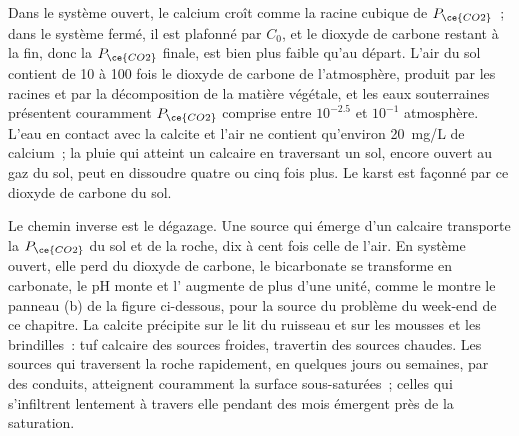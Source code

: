 Dans le système ouvert, le calcium croît comme la racine cubique de $P_{\ce{CO2}}$~; dans
le système fermé, il est plafonné par $C_0$, et le dioxyde de carbone restant à la
fin, donc la $P_{\ce{CO2}}$ finale, est bien plus faible qu'au départ. L'air du
sol contient de 10 à 100 fois le dioxyde de carbone de l'atmosphère, produit par les
racines et par la décomposition de la matière végétale, et les eaux souterraines présentent couramment
$P_{\ce{CO2}}$ comprise entre $10^{-2.5}$ et $10^{-1}$ atmosphère. L'eau en contact
avec la calcite et l'air ne contient qu'environ \qty{20}{mg/L} de calcium~; la pluie qui
atteint un calcaire en traversant un sol, encore ouvert au gaz du sol, peut en
dissoudre quatre ou cinq fois plus. Le karst est façonné par ce dioxyde de carbone du sol.

Le chemin inverse est le dégazage. Une source qui émerge d'un calcaire transporte
la $P_{\ce{CO2}}$ du sol et de la roche, dix à cent fois celle de
l'air. En système ouvert, elle perd du dioxyde de carbone, le bicarbonate se transforme en
carbonate, le pH monte et l' augmente de plus d'une unité,
comme le montre le panneau (b) de la figure ci-dessous, pour la source du
problème du week-end de ce chapitre.
La calcite précipite sur le lit du ruisseau et sur les mousses et les brindilles~: tuf calcaire des
sources froides, travertin des sources chaudes. Les sources qui traversent la roche
rapidement, en quelques jours ou semaines, par des conduits, atteignent couramment la surface
sous-saturées~; celles qui s'infiltrent lentement à travers elle pendant des mois émergent près
de la saturation.

